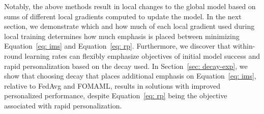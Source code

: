 Notably, the above methods result in local changes to the global model based on sums of different local gradients computed to update the model.
In the next section, we demonstrate which and how much of each local gradient used during local training determines how much emphasis is placed between minimizing Equation~\ref{eq: ims} and Equation~\ref{eq: rp}.
Furthermore, we discover that within-round learning rates can flexibly emphasize objectives of initial model success and rapid personalization based on the decay used.
In Section~\ref{sec: decay-exp}, we show that choosing decay that places additional emphasis on Equation~\ref{eq: ims}, relative to FedAvg and FOMAML, results in solutions with improved personalized performance, despite Equation~\ref{eq: rp} being the objective associated with rapid personalization.

